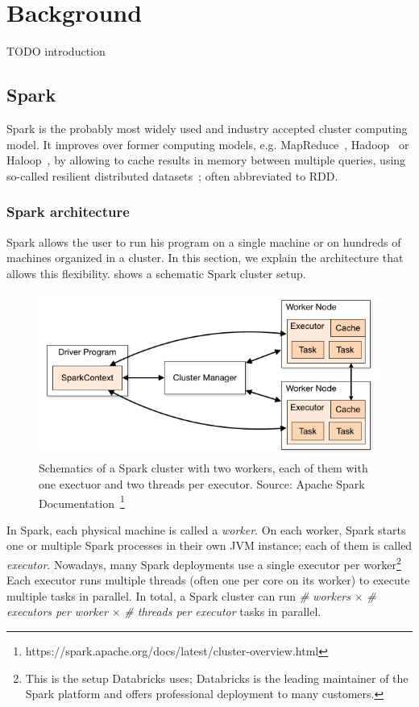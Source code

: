 \section{Background}\label{sec:background}

TODO introduction
\subsection{Spark}
Spark is the probably most widely used and industry accepted cluster computing model.
It improves over former computing models, e.g. MapReduce~\cite{mapreduce}, Hadoop~\cite{Hadoop} or Haloop~\cite{haloop},
by allowing to cache results in memory between multiple queries, using so-called resilient
distributed datasets~\cite{rdd}; often abbreviated to RDD. %

\subsubsection{Spark architecture}
Spark allows the user to run his program on a single machine or on hundreds of machines organized in a cluster.
In this section, we explain the architecture that allows this flexibility.
 shows a schematic Spark cluster setup.

\begin{figure}
    \includegraphics[width=\textwidth]{figures/spark-cluster.png}
    \caption{
      Schematics of a Spark cluster with two workers, each of them with one exectuor and two threads per executor.
      Source: Apache Spark Documentation~\footnote{https://spark.apache.org/docs/latest/cluster-overview.html}
    }
\end{figure}

In Spark, each physical machine is called a \textit{worker}.
On each worker, Spark starts one or multiple Spark processes in their own JVM instance; each of them is called \textit{executor}.
Nowadays, many Spark deployments use a single executor per worker\footnote{This is the setup Databricks uses; Databricks is the leading
maintainer of the Spark platform and offers professional deployment to many customers.}
Each executor runs multiple threads (often one per core on its worker) to execute multiple tasks in parallel.
In total, a Spark cluster can run \textit{\# workers} $\times$ \textit{\# executors per worker} $\times$ \textit{\# threads per executor} tasks
in parallel.

